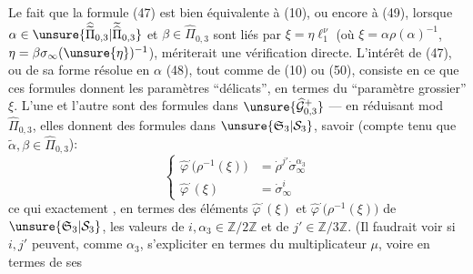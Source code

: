 Le fait que la formule (47) est bien équivalente à (10), ou encore à (49), lorsque $\alpha\in\unsure{\widehat{\widetilde\Pi}_{0,3}|\widetilde{\widehat\Pi}_{0,3}}$ et $\beta\in\widehat\Pi_{0,3}$ sont liés par $\xi=\eta\ell_1^\nu$ (où $\xi=\alpha\rho(\alpha)^{-1}$, $\eta=\beta\sigma_\infty(\unsure{\eta})^{-1}$), mériterait une vérification directe. L'intérêt de (47), ou de  sa forme résolue en $\alpha$ (48), tout comme de (10) ou (50), consiste en ce que ces formules donnent les paramètres ``délicats''\inserted{$\alpha,\beta$}, en termes du ``paramètre grossier'' $\xi$. L'une et l'autre sont des formules dans $\unsure{\widehat{\mathcal G}_{0,3}^{+}}$ --- en réduisant mod $\widehat\Pi_{0,3}$, elles donnent des formules dans $\unsure{\mathfrak S_3|\mathcal S_3}$, savoir (compte tenu que $\widetilde\alpha,\beta\in\widehat\Pi_{0,3}$):
\[
\left\{
\begin{aligned}
\widehat{\varphi}^{\cdot}\bigl(\rho^{-1}(\xi)\bigr)&=\dot\rho^{j'}\dot\sigma_\infty^{\alpha_3}\\
\widehat{\varphi}^{\cdot}(\xi)&=\dot\sigma_\infty^i
\end{aligned}
\right.
\tag{51}
\]
ce qui  exactement , en termes des éléments $\widehat{\varphi}^{\cdot}(\xi)$ et $\widehat{\varphi}^{\cdot}\bigl(\rho^{-1}(\xi)\bigr)$ de $\unsure{\mathfrak S_3|\mathcal S_3}$, les valeurs de $i,\alpha_3\in\mathbb Z/2\mathbb Z$ et de $j'\in\mathbb Z/3\mathbb Z$. (Il faudrait voir si $i,j'$ peuvent, comme $\alpha_3$, s'expliciter en termes du multiplicateur $\mu$, voire en termes de ses


